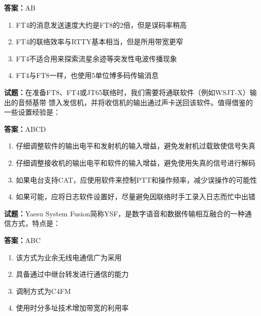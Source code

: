 \documentclass{ctexbook}
\begin{document}
\textbf{答案：}AB 

\begin{enumerate}[leftmargin=3em]
  \item FT4的消息发送速度大约是FT8的2倍，但是误码率稍高 

  \item FT4的联络效率与RTTY基本相当，但是所用带宽更窄 

  \item FT4不适合用来探索流星余迹等突发性电波传播现象 

  \item FT4与FT8一样，也使用5单位博多码传输消息 

\end{enumerate}





\vspace{1em}

\textbf{试题：}在准备FT8、FT4或JT65联络时，我们需要将通联软件（例如WSJT-X）输出的音频基带
馈入发信机，并将收信机的输出通过声卡送回该软件。值得借鉴的一些设置经验是： 

\textbf{答案：}ABCD 

\begin{enumerate}[leftmargin=3em]
  \item 仔细调整软件的输出电平和发射机的输入增益，避免发射机过载致使信号失真 

  \item 仔细调整接收机的输出电平和软件的输入增益，避免使用失真的信号进行解码 

  \item 如果电台支持CAT，应使用软件来控制PTT和操作频率，减少误操作的可能性 

  \item 如果可能，应将日志软件设置好，尽量避免因联络时手工录入日志而忙中出错 

\end{enumerate}





\vspace{1em}

\textbf{试题：}Yaesu System Fusion简称YSF，是数字语音和数据传输相互融合的一种通信方式，特点是： 

\textbf{答案：}ABC 

\begin{enumerate}[leftmargin=3em]
  \item 该方式为业余无线电通信广为采用 

  \item 具备通过中继台转发进行通信的能力 

  \item 调制方式为C4FM 

  \item 使用时分多址技术增加带宽的利用率 

\end{enumerate}
\end{document}
